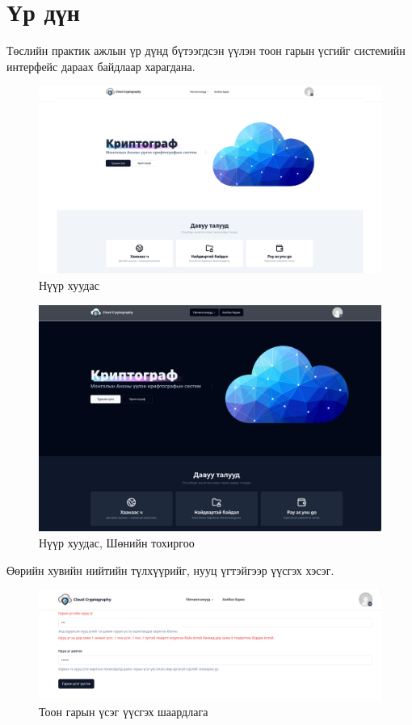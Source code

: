 \section{Үр дүн}
Төслийн практик ажлын үр дүнд бүтээгдсэн үүлэн тоон гарын үсгийг системийн интерфейс дараах байдлаар харагдана.
\begin{figure}[h]
	\centering
	\includegraphics[scale=0.26]{assets/web/hero.png}
	\caption{Нүүр хуудас}
	\label{fig:architecture}
\end{figure}
\begin{figure}[h]
	\centering
	\includegraphics[scale=0.3]{assets/web/darkhero.png}
	\caption{Нүүр хуудас, Шөнийн тохиргоо}
	\label{fig:architecture}
\end{figure}
Өөрийн хувийн нийтийн түлхүүрийг, нууц үгтэйгээр үүсгэх хэсэг.
\begin{figure}[h]
	\centering
	\includegraphics[scale=0.45]{assets/web/makepass.png}
	\caption{Тоон гарын үсэг үүсгэх шаардлага}
	\label{fig:architecture}
\end{figure}
